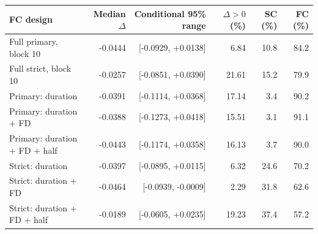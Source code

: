 \begin{tabular}{lrrrrr}
\toprule
FC design & Median $\Delta$ & Conditional 95\% range & $\Delta>0$ (\%) & SC (\%) & FC (\%) \\
\midrule
Full primary, block 10 & -0.0444 & [-0.0929, +0.0138] & 6.84 & 10.8 & 84.2 \\
Full strict, block 10 & -0.0257 & [-0.0851, +0.0390] & 21.61 & 15.2 & 79.9 \\
Primary: duration & -0.0391 & [-0.1114, +0.0368] & 17.14 & 3.4 & 90.2 \\
Primary: duration + FD & -0.0388 & [-0.1273, +0.0418] & 15.51 & 3.1 & 91.1 \\
Primary: duration + FD + half & -0.0443 & [-0.1174, +0.0358] & 16.13 & 3.7 & 90.0 \\
Strict: duration & -0.0397 & [-0.0895, +0.0115] & 6.32 & 24.6 & 70.2 \\
Strict: duration + FD & -0.0464 & [-0.0939, -0.0009] & 2.29 & 31.8 & 62.6 \\
Strict: duration + FD + half & -0.0189 & [-0.0605, +0.0235] & 19.23 & 37.4 & 57.2 \\
\bottomrule
\end{tabular}
